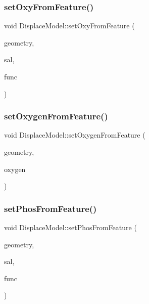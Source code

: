 \mbox{\label{class_displace_model_ae198fa5d4326d20b97d28c70d289effd}} 
\subsubsection{\texorpdfstring{setOxyFromFeature()}{setOxyFromFeature()}}
{\footnotesize\ttfamily void Displace\+Model\+::set\+Oxy\+From\+Feature (\begin{DoxyParamCaption}\item[{O\+G\+R\+Geometry $\ast$}]{geometry,  }\item[{double}]{sal,  }\item[{std\+::function$<$ void(std\+::shared\+\_\+ptr$<$ \mbox{\hyperlink{class_node_data}{Node\+Data}} $>$, int)$>$}]{func }\end{DoxyParamCaption})\hspace{0.3cm}{\ttfamily [protected]}}

\mbox{\label{class_displace_model_ab1b36c0b8e8133a5a8a5093dc4d437a7}} 
\subsubsection{\texorpdfstring{setOxygenFromFeature()}{setOxygenFromFeature()}}
{\footnotesize\ttfamily void Displace\+Model\+::set\+Oxygen\+From\+Feature (\begin{DoxyParamCaption}\item[{O\+G\+R\+Geometry $\ast$}]{geometry,  }\item[{double}]{oxygen }\end{DoxyParamCaption})}

\mbox{\label{class_displace_model_a520f1e660f1e2cd8fc24bf03d95f67b9}} 
\subsubsection{\texorpdfstring{setPhosFromFeature()}{setPhosFromFeature()}}
{\footnotesize\ttfamily void Displace\+Model\+::set\+Phos\+From\+Feature (\begin{DoxyParamCaption}\item[{O\+G\+R\+Geometry $\ast$}]{geometry,  }\item[{double}]{sal,  }\item[{std\+::function$<$ void(std\+::shared\+\_\+ptr$<$ \mbox{\hyperlink{class_node_data}{Node\+Data}} $>$, int)$>$}]{func }\end{DoxyParamCaption})\hspace{0.3cm}{\ttfamily [protected]}}

